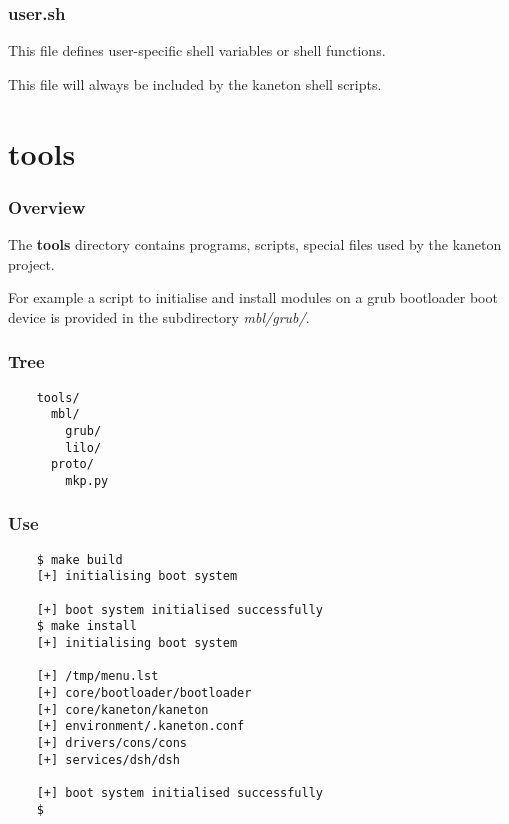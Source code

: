 
\begin{frame}
  \frametitle{user.sh}

  This file defines user-specific shell variables or shell functions.

  \nl

  This file will always be included by the kaneton shell scripts.
\end{frame}

%
%

\section{tools}


\begin{frame}
  \frametitle{Overview}

  The \textbf{tools} directory contains programs, scripts, special
  files used by the kaneton project.

  \nl

  For example a script to initialise and install modules on a grub
  bootloader boot device is provided in the subdirectory
  \textit{mbl/grub/}.
\end{frame}


\begin{frame}[containsverbatim]
  \frametitle{Tree}

  \begin{verbatim}
    tools/
      mbl/
        grub/
        lilo/
      proto/
        mkp.py
  \end{verbatim}
\end{frame}


\begin{frame}[containsverbatim]
  \frametitle{Use}

  \begin{verbatim}
    $ make build
    [+] initialising boot system

    [+] boot system initialised successfully
    $ make install
    [+] initialising boot system

    [+] /tmp/menu.lst
    [+] core/bootloader/bootloader
    [+] core/kaneton/kaneton
    [+] environment/.kaneton.conf
    [+] drivers/cons/cons
    [+] services/dsh/dsh

    [+] boot system initialised successfully
    $
  \end{verbatim}
\end{frame}

